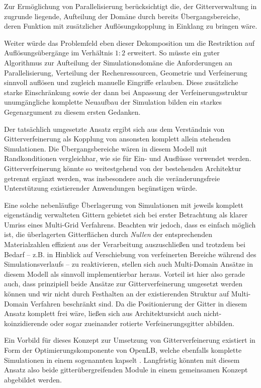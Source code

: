 Zur Ermöglichung von Parallelisierung berücksichtigt die, der Gitterverwaltung in  zugrunde liegende, Aufteilung der Domäne durch  bereits Übergangsbereiche, deren Funktion mit zusätzlicher Auflösungskopplung in Einklang zu bringen wäre.

Weiter würde das Problemfeld eben dieser Dekomposition um die Restriktion auf Auflösungsübergänge im Verhältnis \(1:2\) erweitert. So müsste ein guter Algorithmus zur Aufteilung der Simulationsdomäne die Anforderungen an Parallelisierung, Verteilung der Rechenressourcen, Geometrie und Verfeinerung sinnvoll auflösen und zugleich manuelle Eingriffe erlauben. Diese zusätzliche starke Einschränkung sowie der dann bei Anpassung der Verfeinerungsstruktur unumgängliche komplette Neuaufbau der Simulation bilden ein starkes Gegenargument zu diesem ersten Gedanken.

\bigskip
Der tatsächlich umgesetzte Ansatz ergibt sich aus dem Verständnis von Gitterverfeinerung als Kopplung von ansonsten komplett allein stehenden Simulationen. Die Übergangsbereiche wären in diesem Modell mit Randkonditionen vergleichbar, wie sie für Ein- und Ausflüsse verwendet werden. Gitterverfeinerung könnte so weitestgehend von der bestehenden Architektur getrennt ergänzt werden, was insbesondere auch die veränderungsfreie Unterstützung existierender Anwendungen begünstigen würde.

Eine solche nebenläufige Überlagerung von Simulationen mit jeweils komplett eigenständig verwalteten Gittern gebietet sich bei erster Betrachtung als klarer Umriss eines Multi-Grid Verfahrens. Beachten wir jedoch, dass es einfach möglich ist, die überlagerten Gitterflächen durch \emph{Nullen} der entsprechenden Materialzahlen effizient aus der Verarbeitung auszuschließen und trotzdem bei Bedarf -- z.B. in Hinblick auf Verschiebung von verfeinerten Bereiche während des Simulationsverlaufs -- zu reaktivieren, stellen sich auch Multi-Domain Ansätze in diesem Modell als sinnvoll implementierbar heraus. Vorteil ist hier also gerade auch, dass prinzipiell beide Ansätze zur Gitterverfeinerung umgesetzt werden können und wir nicht durch Festhalten an der existierenden Struktur auf Multi-Domain Verfahren beschränkt sind. Da die Positionierung der Gitter in diesem Ansatz komplett frei wäre, ließen sich aus Architektursicht auch nicht-koinzidierende oder sogar zueinander rotierte Verfeinerungsgitter abbilden.

Ein Vorbild für dieses Konzept zur Umsetzung von Gitterverfeinerung existiert in Form der Optimierungskomponente von OpenLB, welche ebenfalls komplette Simulationen in einem sogenannten  kapselt \cite[vgl.~Abb.~4.1]{Krause10}. Langfristig könnten mit diesem Ansatz also beide gitterübergreifenden Module in einem gemeinsamen Konzept abgebildet werden.

